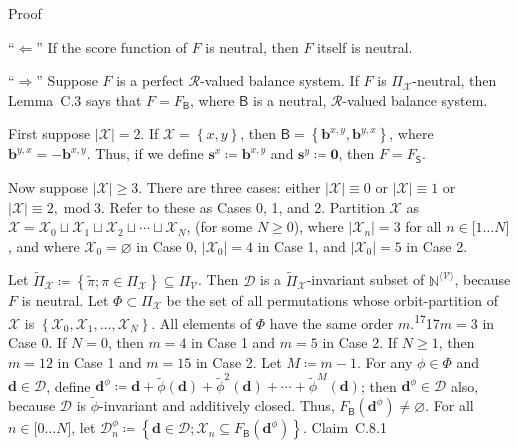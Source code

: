 \documentclass[
]{article}
\begin{document}
Proof

``\(\Longleftarrow\)'' If the score function of \(F\) is neutral, then
\(F\) itself is neutral.

``\(\Longrightarrow\)'' Suppose \(F\) is a perfect
\(\mathcal{R}\)-valued balance system. If \(F\) is
\(\Pi_{\mathcal{X}}\)-neutral, then Lemma~C.3 says that
\(F = F_{\mathsf{B}}\), where \(\mathsf{B}\) is a neutral,
\(\mathcal{R}\)-valued balance system.

First suppose \(\left| \mathcal{X} \right| = 2\). If
\(\mathcal{X} = \left\{ x,y \right\}\), then
\(\mathsf{B} = \left\{ \mathbf{b}^{x,y},\mathbf{b}^{y,x} \right\}\),
where \(\mathbf{b}^{y,x} = - \mathbf{b}^{x,y}\). Thus, if we define
\(\mathbf{s}^{x} ≔ \mathbf{b}^{x,y}\) and
\(\mathbf{s}^{y} ≔ \mathbf{0}\), then \(F = F_{\mathsf{S}}\).

Now suppose \(\left| \mathcal{X} \right| \geq 3\). There are three
cases: either \(\left| \mathcal{X} \right| \equiv 0\) or
\(\left| \mathcal{X} \right| \equiv 1\) or
\(\left| \mathcal{X} \right| \equiv 2,\operatorname{mod}3\). Refer to
these as Cases 0, 1, and 2. Partition \(\mathcal{X}\) as
\(\mathcal{X} = \mathcal{X}_{0} \sqcup \mathcal{X}_{1} \sqcup \mathcal{X}_{2} \sqcup \cdots \sqcup \mathcal{X}_{N}\),
(for some \(N \geq 0\)), where \(\left| \mathcal{X}_{n} \right| = 3\)
for all \(n \in \lbrack 1\ldots N\rbrack\), and where
\(\mathcal{X}_{0} = \varnothing\) in Case 0,
\(\left| \mathcal{X}_{0} \right| = 4\) in Case 1, and
\(\left| \mathcal{X}_{0} \right| = 5\) in Case 2.

Let
\({\widetilde{\Pi}}_{\mathcal{X}} ≔ \left\{ \widetilde{\pi};\pi \in \Pi_{\mathcal{X}} \right\} \subseteq \Pi_{\mathcal{V}}\).
Then \(\mathcal{D}\) is a \({\widetilde{\Pi}}_{\mathcal{X}}\)-invariant
subset of \(\mathbb{N}^{\langle\mathcal{V}\rangle}\), because \(F\) is
neutral. Let \(\Phi \subset \Pi_{\mathcal{X}}\) be the set of all
permutations whose orbit-partition of \(\mathcal{X}\) is
\(\left\{ \mathcal{X}_{0},\mathcal{X}_{1},\ldots,\mathcal{X}_{N} \right\}\).
All elements of \(\Phi\) have the same order
\(m\).\textsuperscript{17}17\(m = 3\) in Case 0. If \(N = 0\), then
\(m = 4\) in Case 1 and \(m = 5\) in Case 2. If \(N \geq 1\), then
\(m = 12\) in Case 1 and \(m = 15\) in Case 2. Let \(M ≔ m - 1\). For
any \(\phi \in \Phi\) and \(\mathbf{d} \in \mathcal{D}\), define
\(\mathbf{d}^{\phi} ≔ \mathbf{d} + \widetilde{\phi}\left( \mathbf{d} \right) + {\widetilde{\phi}}^{2}\left( \mathbf{d} \right) + \cdots + {\widetilde{\phi}}^{M}\left( \mathbf{d} \right)\);
then \(\mathbf{d}^{\phi} \in \mathcal{D}\) also, because \(\mathcal{D}\)
is \(\widetilde{\phi}\)-invariant and additively closed. Thus,
\(F_{\mathsf{B}}\left( \mathbf{d}^{\phi} \right) \neq \varnothing\).
For all \(n \in \lbrack 0\ldots N\rbrack\), let
\(\mathcal{D}_{n}^{\phi} ≔ \left\{ \mathbf{d} \in \mathcal{D};\mathcal{X}_{n} \subseteq F_{\mathsf{B}}\left( \mathbf{d}^{\phi} \right) \right\}\).
Claim~C.8.1
\end{document}
